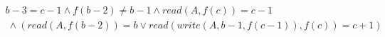 \begin{gather*}
%
b - 3 = c - 1
%
\land
%
f(b - 2)  \neq  b - 1
%
\land
%
\mathit{read}(A,f(c)) = c - 1
~\\~
%
\land
%
(\mathit{read}(A,f(b - 2)) = b \lor \mathit{read}(\mathit{write}(A,b - 1,f(c - 1)),f(c)) = c + 1)
%
\end{gather*}
